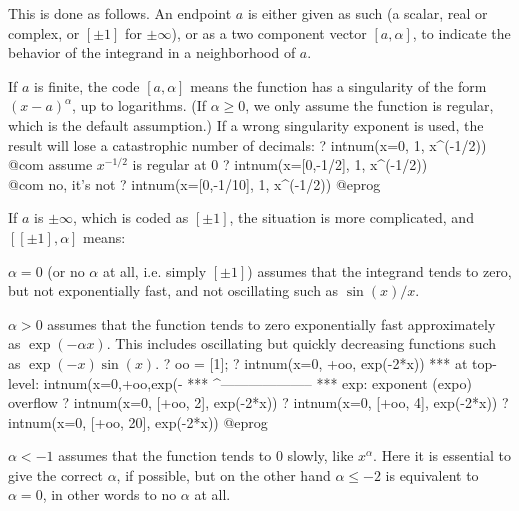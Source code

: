 This is done as follows. An endpoint $a$ is either given as such (a scalar,
real or complex, or $[\pm1]$ for $\pm\infty$), or as a two component vector
$[a,\alpha]$, to indicate the behavior of the integrand in a neighborhood
of $a$.

If $a$ is finite, the code $[a,\alpha]$ means the function has a
singularity of the form $(x-a)^{\alpha}$, up to logarithms. (If $\alpha \ge
0$, we only assume the function is regular, which is the default assumption.)
If a wrong singularity exponent is used, the result will lose a catastrophic
number of decimals:
\bprog
? intnum(x=0, 1, x^(-1/2))         \\@com assume $x^{-1/2}$ is regular at 0
? intnum(x=[0,-1/2], 1, x^(-1/2))  \\@com no, it's not
? intnum(x=[0,-1/10], 1, x^(-1/2))
@eprog

If $a$ is $\pm\infty$, which is coded as $[\pm 1]$, the situation is more
complicated, and $[[\pm1],\alpha]$ means:

\item $\alpha=0$ (or no $\alpha$ at all, i.e. simply $[\pm1]$) assumes that the
integrand tends to zero, but not exponentially fast, and not
oscillating such as $\sin(x)/x$.

\item $\alpha>0$ assumes that the function tends to zero exponentially fast
approximately as $\exp(-\alpha x)$. This includes oscillating but quickly
decreasing functions such as $\exp(-x)\sin(x)$.
\bprog
? oo = [1];
? intnum(x=0, +oo, exp(-2*x))
  ***   at top-level: intnum(x=0,+oo,exp(-
  ***                 ^--------------------
  *** exp: exponent (expo) overflow
? intnum(x=0, [+oo, 2], exp(-2*x))
? intnum(x=0, [+oo, 4], exp(-2*x))
? intnum(x=0, [+oo, 20], exp(-2*x))
@eprog

\item $\alpha<-1$ assumes that the function tends to $0$ slowly, like
$x^{\alpha}$. Here it is essential to give the correct $\alpha$, if possible,
but on the other hand $\alpha\le -2$ is equivalent to $\alpha=0$, in other
words to no $\alpha$ at all.

